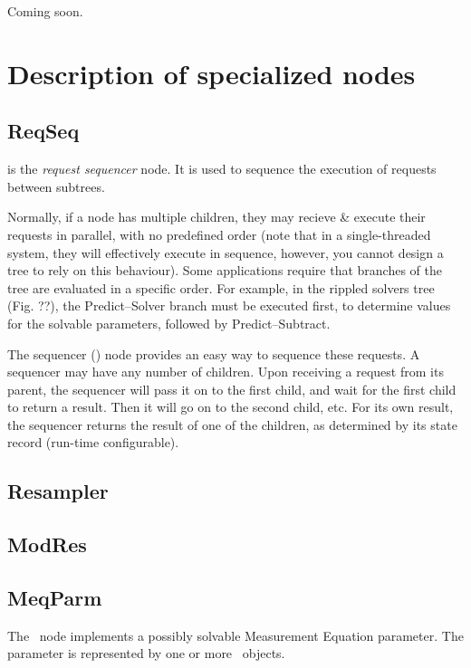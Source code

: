   Coming soon.

\chapter{Description of specialized nodes}

\section{ReqSeq}

   is the {\em request sequencer} node. It is used to sequence the
  execution of requests between subtrees.
  
  Normally, if a node has multiple children, they may recieve \& execute their
  requests in parallel, with no predefined order (note that in a
  single-threaded system, they will effectively execute in sequence, however,
  you cannot design a tree to rely on this behaviour). Some applications
  require that branches of the tree are evaluated in a specific order. For
  example, in the rippled solvers tree (Fig. ??), the Predict--Solver branch
  must be executed first, to determine values for the solvable parameters,
  followed by Predict--Subtract.
  
  The sequencer () node provides an easy way to sequence these
  requests. A sequencer may have any number of children. Upon receiving a
  request from its parent, the sequencer will pass it on to the first child,
  and wait for the first child to return a result. Then it will go on to the
  second child, etc. For its own result, the sequencer returns the result of
  one of the children, as determined by its state record (run-time
  configurable).

\section{Resampler}

\section{ModRes}

\section{MeqParm}

  The \Parm\ node implements a possibly solvable Measurement Equation
  parameter. The parameter is represented by one or more \Polc\ objects.

